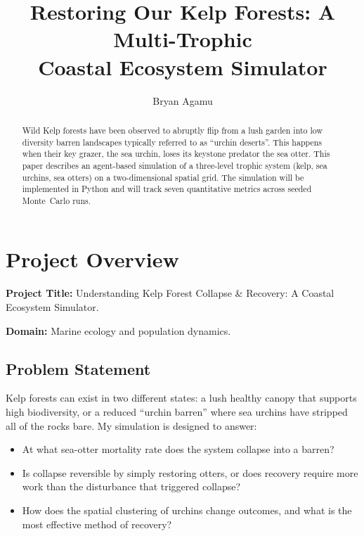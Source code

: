 \documentclass[manuscript,nonacm,11pt]{acmart}
\begin{document}
\title{Restoring Our Kelp Forests: A Multi-Trophic\\ Coastal Ecosystem Simulator}

\author{Bryan Agamu}
\email{}

\renewcommand{\shortauthors}{Bryan}

\begin{abstract}
Wild Kelp forests have been observed to abruptly flip from a lush garden into low diversity
barren landscapes typically referred to as ``urchin deserts''. This happens when their key grazer,
the sea urchin, loses its keystone predator the sea otter.
This paper describes an agent-based simulation of a three-level trophic system (kelp, sea urchins, sea
otters) on a two-dimensional spatial grid. The simulation will be implemented in Python
and will track seven quantitative metrics across seeded Monte~Carlo runs.
\end{abstract}

\maketitle
\pagestyle{plain}  %
\thispagestyle{plain}

\section{Project Overview}

\textbf{Project Title:} Understanding Kelp Forest Collapse \& Recovery: A Coastal Ecosystem Simulator.

\textbf{Domain:} Marine ecology and population dynamics. 

\subsection{Problem Statement}
Kelp forests can exist in two different states: a lush healthy canopy that supports high biodiversity,
or a reduced ``urchin barren'' where sea urchins have stripped all of the rocks bare.
My simulation is designed to answer:
\begin{itemize}
  \item At what sea-otter mortality rate does the system collapse into a barren?
  \item Is collapse reversible by simply restoring otters, or does recovery require
        more work than the disturbance that triggered collapse?
  \item How does the spatial clustering of urchins change outcomes, and what is the most effective
        method of recovery?
\end{itemize}
\end{document}
